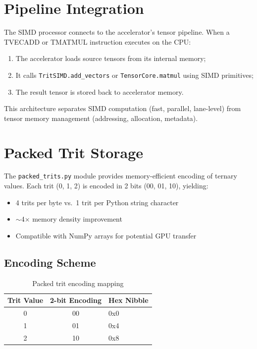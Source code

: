 \documentclass[10pt,a4paper,twoside]{book}
\begin{document}
\section{Pipeline Integration}

The SIMD processor connects to the accelerator's tensor pipeline. When a TVECADD
or TMATMUL instruction executes on the CPU:
\begin{enumerate}
    \item The accelerator loads source tensors from its internal memory;
    \item It calls \texttt{TritSIMD.add\_vectors} or \texttt{TensorCore.matmul}
          using SIMD primitives;
    \item The result tensor is stored back to accelerator memory.
\end{enumerate}
This architecture separates SIMD computation (fast, parallel, lane-level) from
tensor memory management (addressing, allocation, metadata).

\section{Packed Trit Storage}

The \texttt{packed\_trits.py} module provides memory-efficient encoding of ternary
values. Each trit (0, 1, 2) is encoded in 2 bits (00, 01, 10), yielding:
\begin{itemize}
    \item 4 trits per byte vs.\ 1 trit per Python string character
    \item $\sim$4$\times$ memory density improvement
    \item Compatible with NumPy arrays for potential GPU transfer
\end{itemize}

\subsection{Encoding Scheme}

\begin{table}[H]
\centering
\caption{Packed trit encoding mapping}
\label{tab:packedenc}
\begin{tabular}{ccl}
\toprule
Trit Value & 2-bit Encoding & Hex Nibble \\
\midrule
0 & 00 & 0x0 \\
1 & 01 & 0x4 \\
2 & 10 & 0x8 \\
\bottomrule
\end{tabular}
\end{table}
\end{document}
